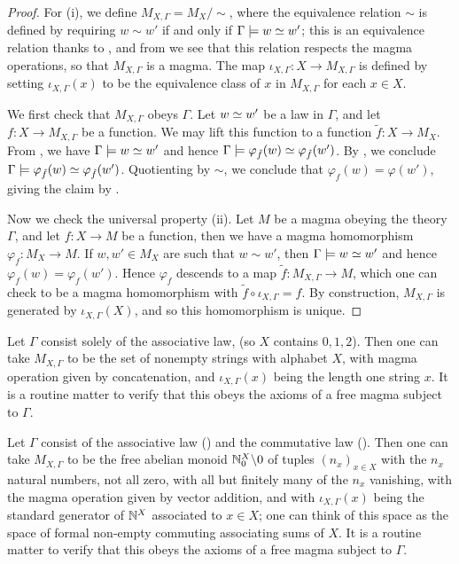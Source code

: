 \begin{proof}\leanok
  For (i), we define $M_{X,\Gamma} = M_X / \sim$, where the equivalence relation $\sim$ is defined by requiring $w \sim w'$ if and only if $\Gamma \models w \simeq w'$; this is an equivalence relation thanks to , and from  we see that this relation respects the magma operations, so that $M_{X,\Gamma}$ is a magma. The map $\iota_{X,\Gamma}: X \to M_{X,\Gamma}$ is defined by setting $\iota_{X,\Gamma}(x)$ to be the equivalence class of $x$ in $M_{X,\Gamma}$ for each $x \in X$.

  We first check that $M_{X,\Gamma}$ obeys $\Gamma$. Let $w \simeq w'$ be a law in $\Gamma$, and let $f: X \to M_{X,\Gamma}$ be a function. We may lift this function to a function $\tilde{f}: X \to M_X$. From , we have $\Gamma \models w \simeq w'$ and hence $\Gamma \models \varphi_{\tilde{f}}(w) \simeq \varphi_{\tilde{f}}(w')$. By , we conclude $\Gamma \models \varphi_{\tilde{f}}(w) \simeq \varphi_{\tilde{f}}(w')$. Quotienting by $\sim$, we conclude that $\varphi_f(w) = \varphi(w')$, giving the claim by .

  Now we check the universal property (ii). Let $M$ be a magma obeying the theory $\Gamma$, and let $f: X \to M$ be a function, then we have a magma homomorphism $\varphi_f: M_X \to M$. If $w, w' \in M_X$ are such that $w \sim w'$, then $\Gamma \models w \simeq w'$ and hence $\varphi_f(w) = \varphi_f(w')$. Hence $\varphi_f$ descends to a map $\tilde{f}: M_{X,\Gamma} \to M$, which one can check to be a magma homomorphism with $\tilde{f} \circ \iota_{X,\Gamma} = f$. By construction, $M_{X,\Gamma}$ is generated by $\iota_{X,\Gamma}(X)$, and so this homomorphism is unique.
\end{proof}

\begin{example}
  Let $\Gamma$ consist solely of the associative law,  (so $X$ contains $0,1,2$). Then one can take $M_{X,\Gamma}$ to be the set of nonempty strings with alphabet $X$, with magma operation given by concatenation, and $\iota_{X,\Gamma}(x)$ being the length one string $x$. It is a routine matter to verify that this obeys the axioms of a free magma subject to $\Gamma$.
\end{example}

\begin{example}\label{facm}
  Let $\Gamma$ consist of the associative law () and the commutative law (). Then one can take $M_{X,\Gamma}$ to be the free abelian monoid $\mathbb{N}_0^X \backslash 0$ of tuples $(n_x)_{x \in X}$ with the $n_x$ natural numbers, not all zero, with all but finitely many of the $n_x$ vanishing, with the magma operation given by vector addition, and with $\iota_{X,\Gamma}(x)$ being the standard generator of $\mathbb{N}^X$ associated to $x \in X$; one can think of this space as the space of formal non-empty commuting associating sums of $X$. It is a routine matter to verify that this obeys the axioms of a free magma subject to $\Gamma$.
\end{example}

